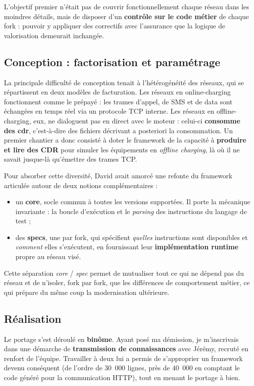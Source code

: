 L'objectif premier n'était pas de couvrir fonctionnellement chaque réseau dans
les moindres détails, mais de disposer d'un \textbf{contrôle sur le code métier}
de chaque fork : pouvoir y appliquer des correctifs avec l'assurance que la
logique de valorisation demeurait inchangée.

\subsection{Conception : factorisation et paramétrage}
La principale difficulté de conception tenait à l'hétérogénéité des réseaux,
qui se répartissent en deux modèles de facturation. Les réseaux en
\gls{online-charging} fonctionnent comme le prépayé : les trames d'appel, de
SMS et de data sont échangées en temps réel via un protocole TCP interne. Les
réseaux en \gls{offline-charging}, eux, ne dialoguent pas en direct avec le
moteur : celui-ci \textbf{consomme des \gls{cdr}}, c'est-à-dire des fichiers
décrivant a posteriori la consommation. Un premier chantier a donc consisté à
doter le framework de la capacité à \textbf{produire et lire des CDR} pour
simuler les équipements en \emph{offline charging}, là où il ne savait jusque-là
qu'émettre des trames TCP.

Pour absorber cette diversité, David avait amorcé une refonte du framework
articulée autour de deux notions complémentaires :
\begin{itemize}
  \item un \textbf{core}, socle commun à toutes les versions supportées. Il
        porte la mécanique invariante : la boucle d'exécution et le
        \emph{parsing} des instructions du langage de test ;
  \item des \textbf{specs}, une par fork, qui spécifient \emph{quelles}
        instructions sont disponibles et \emph{comment} elles s'exécutent, en
        fournissant leur \textbf{implémentation runtime} propre au réseau visé.
\end{itemize}
Cette séparation \emph{core} / \emph{spec} permet de mutualiser tout ce qui ne
dépend pas du réseau et de n'isoler, fork par fork, que les différences de
comportement métier, ce qui prépare du même coup la modernisation ultérieure.

\subsection{Réalisation}
Le portage s'est déroulé en \textbf{binôme}. Ayant posé ma démission, je
m'inscrivais dans une démarche de \textbf{transmission de connaissances} avec
Jérémy, recruté en renfort de l'équipe. Travailler à deux lui a permis de
s'approprier un framework devenu conséquent (de l'ordre de 30~000 lignes, près
de 40~000 en comptant le code généré pour la communication HTTP), tout en menant
le portage à bien.

